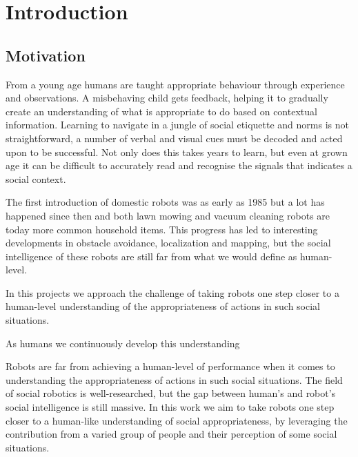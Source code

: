 \documentclass[a4paper,12pt]{report}
\begin{document}
\pagestyle{empty}
\singlespacing

\onehalfspacing

\singlespacing


\setcounter{page}{0}
\pagestyle{plain}
\tableofcontents

\mbox{}

\printnomenclature

\listoffigures
\listoftables

\onehalfspacing


\chapter{Introduction}
\setcounter{page}{1} 
\section{Motivation}
From a young age humans are taught appropriate behaviour through experience and observations. A misbehaving child gets feedback, helping it to gradually create an understanding of what is appropriate to do based on contextual information. Learning to navigate in a jungle of social etiquette and norms is not straightforward, a number of verbal and visual cues must be decoded and acted upon to be successful.  Not only does this takes years to learn, but even at grown age it can be difficult to accurately read and recognise the signals that indicates a social context. 

The first introduction of domestic robots was as early as 1985 \cite{breazeal2016social} but a lot has happened since then and both lawn mowing and vacuum cleaning robots are today more common household items. This progress has led to interesting developments in obstacle avoidance, localization and mapping, but the social intelligence of these robots are still far from what we would define as human-level.


In this projects we approach the challenge of taking robots one step closer to a  human-level understanding of the appropriateness of actions in such social situations. 

As humans we continuously develop this understanding

Robots are far from achieving a human-level of performance when it comes to understanding the appropriateness of actions in such social situations. The field of social robotics is well-researched, but the gap between human's and robot's social intelligence is still massive. In this work we aim to take robots one step closer to a human-like understanding of social appropriateness, by leveraging the contribution from a varied group of people and their perception of some social situations.
\end{document}
